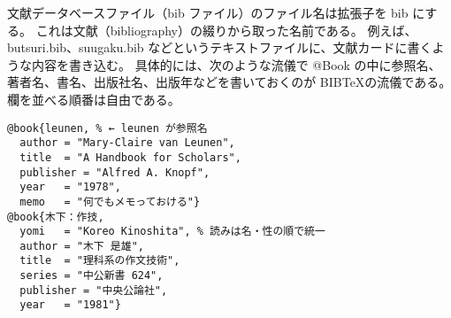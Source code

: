 文献データベースファイル（bib ファイル）のファイル名は拡張子を bib にする。
これは文献（bibliography）の綴りから取った名前である。
例えば、butsuri.bib、suugaku.bib などというテキストファイルに、文献カードに書くような内容を書き込む。
具体的には、次のような流儀で @{}Book{} の中に参照名、著者名、書名、出版社名、出版年などを書いておくのが B{\scriptsize IB}\hspc{-1.50pt}\TeX{}の流儀である。
欄を並べる順番は自由である。
\begin{mdframed}[roundcorner=0.50zw,leftmargin=3.00zw,rightmargin=3.00zw,skipabove=0.40zw,skipbelow=0.40zw,innertopmargin=4.00pt,innerbottommargin=4.00pt,innerleftmargin=5.00pt,innerrightmargin=5.00pt,linecolor=gray!020,linewidth=0.50pt,backgroundcolor=gray!20]
\begin{verbatim}
@book{leunen, % ← leunen が参照名
  author = "Mary-Claire van Leunen",
  title  = "A Handbook for Scholars",
  publisher = "Alfred A. Knopf",
  year   = "1978",
  memo   = "何でもメモっておける"}
@book{木下：作技,
  yomi   = "Koreo Kinoshita", % 読みは名・性の順で統一
  author = "木下 是雄",
  title  = "理科系の作文技術",
  series = "中公新書 624",
  publisher = "中央公論社",
  year   = "1981"}
\end{verbatim}
\end{mdframed}
